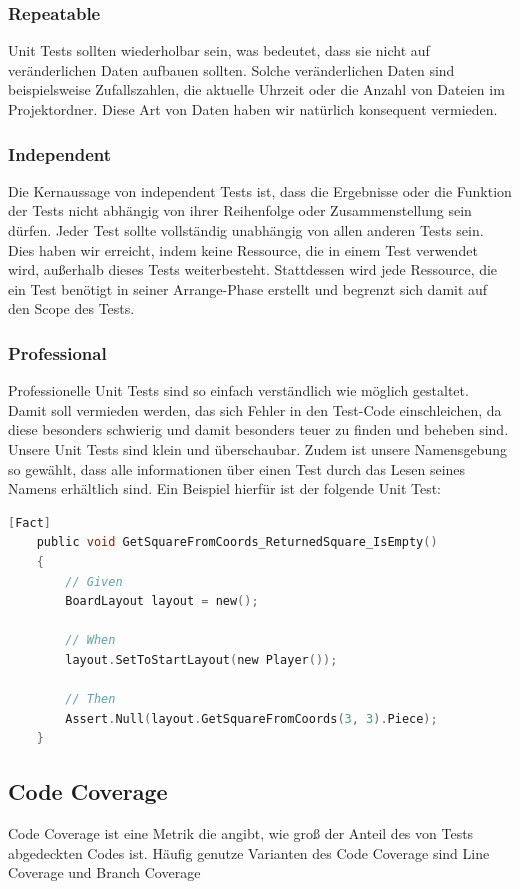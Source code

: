 \documentclass[
10pt, %
a4paper, %
oneside, %
headinclude,footinclude, %
BCOR5mm, %
]{scrartcl}
\begin{document}
\begin{onehalfspace}
\subsubsection{Repeatable}
Unit Tests sollten wiederholbar sein, was bedeutet, dass sie nicht auf veränderlichen Daten aufbauen sollten. Solche veränderlichen Daten sind beispielsweise Zufallszahlen, die aktuelle Uhrzeit oder die Anzahl von Dateien im Projektordner. Diese Art von Daten haben wir natürlich konsequent vermieden.
\subsubsection{Independent}
Die Kernaussage von independent Tests ist, dass die Ergebnisse oder die Funktion der Tests nicht abhängig von ihrer Reihenfolge oder Zusammenstellung sein dürfen. Jeder Test sollte vollständig unabhängig von allen anderen Tests sein. Dies haben wir erreicht, indem keine Ressource, die in einem Test verwendet wird, außerhalb dieses Tests weiterbesteht. Stattdessen wird jede Ressource, die ein Test benötigt in seiner Arrange-Phase erstellt und begrenzt sich damit auf den Scope des Tests.
\subsubsection{Professional}
Professionelle Unit Tests sind so einfach verständlich wie möglich gestaltet. Damit soll vermieden werden, das sich Fehler in den Test-Code einschleichen, da diese besonders schwierig und damit besonders teuer zu finden und beheben sind.
Unsere Unit Tests sind klein und überschaubar. Zudem ist unsere Namensgebung so gewählt, dass alle informationen über einen Test durch das Lesen seines Namens erhältlich sind. Ein Beispiel hierfür ist der folgende Unit Test:
\begin{lstlisting}[language=c, style=mStyle]
	[Fact]
	public void GetSquareFromCoords_ReturnedSquare_IsEmpty()
	{
		// Given
		BoardLayout layout = new();

		// When
		layout.SetToStartLayout(new Player());
		
		// Then
		Assert.Null(layout.GetSquareFromCoords(3, 3).Piece);
	}
\end{lstlisting}

\subsection{Code Coverage}
Code Coverage ist eine Metrik die angibt, wie groß der Anteil des von Tests abgedeckten Codes ist. Häufig genutze Varianten des Code Coverage sind Line Coverage und Branch Coverage


\end{onehalfspace}
\end{document}
